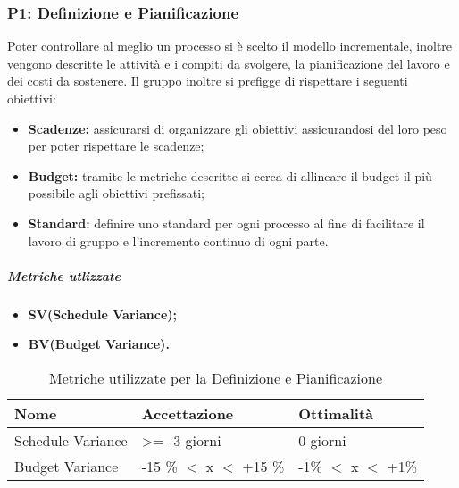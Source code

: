 \subsubsection{P1: Definizione e Pianificazione}
Poter controllare al meglio un processo si è scelto il modello incrementale, inoltre vengono descritte le attività e i compiti da svolgere, la pianificazione del lavoro e dei costi da sostenere. Il gruppo inoltre si prefigge di rispettare i seguenti obiettivi:
\begin{itemize}
		\item{\textbf{Scadenze:} assicurarsi di organizzare gli obiettivi assicurandosi del loro peso per poter rispettare le scadenze;}
		\item{\textbf{Budget:} tramite le metriche descritte si cerca di allineare il budget il più possibile agli obiettivi prefissati;}
		\item{\textbf{Standard:} definire uno standard per ogni processo al fine di facilitare il lavoro di gruppo e l'incremento continuo di ogni parte.}
\end{itemize} 
\subparagraph{Metriche utlizzate}
\begin{itemize}
	\item{\textbf{SV(Schedule Variance);}}
	\item{\textbf{BV(Budget Variance).}}
\end{itemize}
\begin{table}[!htpb]
	\centering
	\renewcommand{\arraystretch}{2} 
	\begin{tabular}{|l|l|l|}
		\hline
		\rowcolor{orange!50} 
		\textbf{Nome} & \textbf{Accettazione} & \textbf{Ottimalità} \\
		\hline
		Schedule Variance & \textgreater = -3 giorni &0 giorni \\
		\hline
		Budget Variance & -15 \% $<$ x $<$ +15 \% & -1\% $<$ x $<$ +1\% \\ 
		\hline
	\end{tabular}
	\caption{Metriche utilizzate per la Definizione e Pianificazione}
\end{table}

